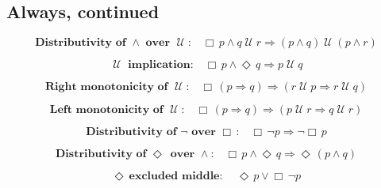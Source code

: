 \documentclass[12pt, fleqn, leqno]{article}
\newcommand{\impl}{\ensuremath{\Rightarrow}}        %
\newcommand{\Until}{\;\mathcal{U}\;}
\newcommand{\Event}{\Diamond\,}
\newcommand{\Always}{\Box\,}
\newcommand{\spacer}{\vspace{-30pt}}
\begin{document}
\subsection*{Always, continued}

\begin{equation}\label{E:andUntilDist}
\textbf{Distributivity of $\land$ over $\Until$:}\quad \Always p \land q \Until r \impl (p \land q) \Until (p \land r)
\end{equation}

\spacer

\begin{equation}\label{E:axiomUntilImpl}
\textbf{$\Until$ implication:}\quad \Always p \land \Event q \impl p \Until q
\end{equation}

\spacer

\begin{equation}\label{E:rightMonoUntil}
\textbf{Right monotonicity of $\Until$:}\quad \Always (p \impl q) \impl (r \Until p \impl r \Until q)
\end{equation}

\spacer

\begin{equation}\label{E:leftMonoUntil}
\textbf{Left monotonicity of $\Until$:}\quad \Always (p \impl q) \impl (p \Until r \impl q \Until r)
\end{equation}
\spacer

\begin{equation}\label{E:exAlwaysNot}
\textbf{Distributivity of $\neg$ over $\Always$:}\quad \Always\neg p \impl \neg\Always p
\end{equation}

\spacer

\begin{equation}\label{E:alwaysAndEvent}
\textbf{Distributivity of $\Event$ over $\land$:}\quad \Always p \land \Event q \impl \Event (p \land q)
\end{equation}

\spacer

\begin{equation}\label{E:excludedMid}
\textbf{$\Event$ excluded middle:}\quad \Event p \lor \Always\neg p
\end{equation}

\spacer
\end{document}
